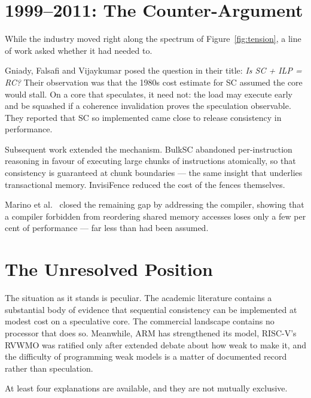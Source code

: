 \section{1999--2011: The Counter-Argument}

While the industry moved right along the spectrum of Figure~\ref{fig:tension}, a
line of work asked whether it had needed to.

Gniady, Falsafi and Vijaykumar \cite{gniady1999sc} posed the question in their
title: \emph{Is SC + ILP = RC?} Their observation was that the 1980s cost estimate
for SC assumed the core would stall.
On a core that speculates, it need not: the
load may execute early and be squashed if a coherence invalidation proves the
speculation observable.
They reported that SC so implemented came close to release
consistency in performance.

Subsequent work extended the mechanism.
BulkSC \cite{ceze2007bulksc} abandoned
per-instruction reasoning in favour of executing large chunks of instructions
atomically, so that consistency is guaranteed at chunk boundaries --- the same
insight that underlies transactional memory.
InvisiFence
\cite{blundell2009invisifence} reduced the cost of the fences themselves.

Marino et al.\ \cite{marino2011sc} closed the remaining gap by addressing the
compiler, showing that a compiler forbidden from reordering shared memory accesses
loses only a few per cent of performance --- far less than had been assumed.

\section{The Unresolved Position}

The situation as it stands is peculiar.
The academic literature contains a
substantial body of evidence that sequential consistency can be implemented at
modest cost on a speculative core.
The commercial landscape contains no processor
that does so.
Meanwhile, ARM has strengthened its model, RISC-V's RVWMO was
ratified only after extended debate about how weak to make it, and the difficulty
of programming weak models is a matter of documented record rather than
speculation.

At least four explanations are available, and they are not mutually exclusive.

